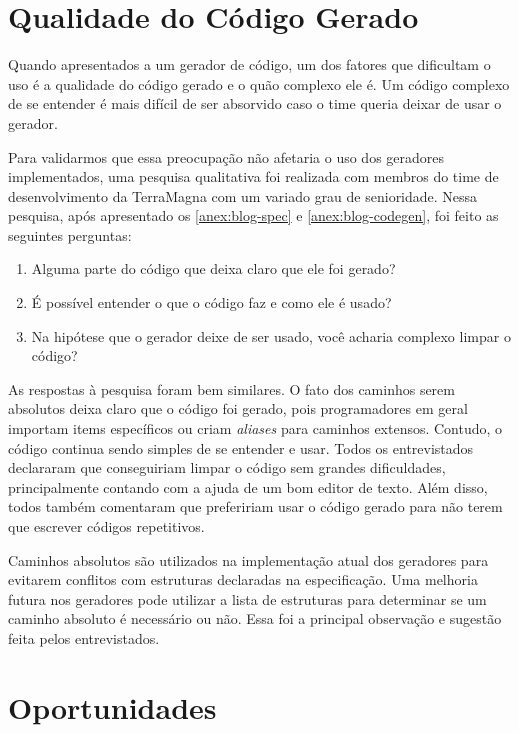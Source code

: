 \section{Qualidade do Código Gerado}

Quando apresentados a um gerador de código, um dos fatores que dificultam o uso é a qualidade
do código gerado e o quão complexo ele é. Um código complexo de se entender é mais difícil
de ser absorvido caso o time queria deixar de usar o gerador.

Para validarmos que essa preocupação não afetaria o uso dos geradores implementados, uma
pesquisa qualitativa foi realizada com membros do time de desenvolvimento da TerraMagna com
um variado grau de senioridade. Nessa pesquisa, após apresentado os \cref{anex:blog-spec} e
\cref{anex:blog-codegen}, foi feito as seguintes perguntas:

\begin{enumerate}
\item Alguma parte do código que deixa claro que ele foi gerado?
\item É possível entender o que o código faz e como ele é usado?
\item Na hipótese que o gerador deixe de ser usado, você acharia complexo limpar o código?
\end{enumerate}

As respostas à pesquisa foram bem similares. O fato dos caminhos serem absolutos deixa claro
que o código foi gerado, pois programadores em geral importam items específicos ou criam
\textit{aliases} para caminhos extensos. Contudo, o código continua sendo simples de se
entender e usar. Todos os entrevistados declararam que conseguiriam limpar o código sem
grandes dificuldades, principalmente contando com a ajuda de um bom editor de texto. Além
disso, todos também comentaram que prefeririam usar o código gerado para não terem que
escrever códigos repetitivos.

Caminhos absolutos são utilizados na implementação atual dos geradores para evitarem conflitos
com estruturas declaradas na especificação. Uma melhoria futura nos geradores pode utilizar a
lista de estruturas para determinar se um caminho absoluto é necessário ou não. Essa foi a
principal observação e sugestão feita pelos entrevistados.

\section{Oportunidades}

